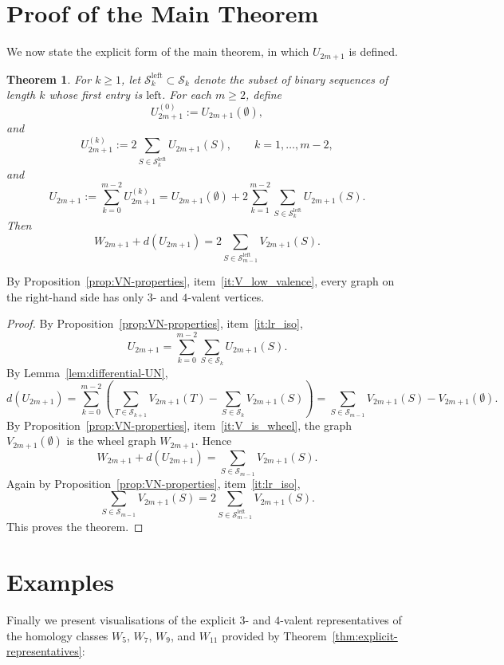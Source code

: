 \documentclass[11pt]{article}
\theoremstyle{definition}
\theoremstyle{plain}
\newtheorem{theorem}[definition]{Theorem}
\newcommand{\LeftChoice}{\mathrm{left}}
\begin{document}
\section{Proof of the Main Theorem}
We now state the explicit form of the main theorem, in which $U_{2m+1}$ is defined.

\begin{theorem}\label{thm:main-reduction}\label{thm:explicit-representatives}
For $k\geq 1$, let $\mathcal{S}_k^{\LeftChoice}\subset \mathcal{S}_k$ denote the subset of binary sequences of length $k$ whose first entry is $\LeftChoice$.
For each $m\geq 2$, define
\[
U_{2m+1}^{(0)}:=U_{2m+1}(\emptyset),
\]
and
\[
U_{2m+1}^{(k)}:=2\sum_{S\in \mathcal{S}_k^{\LeftChoice}} U_{2m+1}(S),
\qquad k=1,\dots,m-2,
\]
and
\[
U_{2m+1}:=\sum_{k=0}^{m-2} U_{2m+1}^{(k)}
=
U_{2m+1}(\emptyset)+2\sum_{k=1}^{m-2}\sum_{S\in \mathcal{S}_k^{\LeftChoice}} U_{2m+1}(S).
\]
Then
\[
W_{2m+1}+d(U_{2m+1})=2\sum_{S\in \mathcal{S}_{m-1}^{\LeftChoice}}V_{2m+1}(S).
\]
\end{theorem}

By Proposition~\ref{prop:VN-properties}, item~\ref{it:V_low_valence}, every graph on the right-hand side has only $3$- and $4$-valent vertices.

\begin{proof}
By Proposition~\ref{prop:VN-properties}, item~\ref{it:lr_iso},
\[
U_{2m+1}=\sum_{k=0}^{m-2}\sum_{S\in \mathcal{S}_k}U_{2m+1}(S).
\]
By Lemma~\ref{lem:differential-UN},
\[
d(U_{2m+1})
=
\sum_{k=0}^{m-2}
\left(
\sum_{T\in \mathcal{S}_{k+1}}V_{2m+1}(T)-\sum_{S\in \mathcal{S}_k}V_{2m+1}(S)
\right)
=
\sum_{S\in \mathcal{S}_{m-1}}V_{2m+1}(S)-V_{2m+1}(\emptyset).
\]
By Proposition~\ref{prop:VN-properties}, item~\ref{it:V_is_wheel}, the graph $V_{2m+1}(\emptyset)$ is the wheel graph $W_{2m+1}$. Hence
\[
W_{2m+1}+d(U_{2m+1})=\sum_{S\in \mathcal{S}_{m-1}}V_{2m+1}(S).
\]
Again by Proposition~\ref{prop:VN-properties}, item~\ref{it:lr_iso},
\[
\sum_{S\in \mathcal{S}_{m-1}}V_{2m+1}(S)
=
2\sum_{S\in \mathcal{S}_{m-1}^{\LeftChoice}}V_{2m+1}(S).
\]
This proves the theorem.
\end{proof}

\section{Examples}
Finally we present visualisations of the explicit $3$- and $4$-valent representatives of the homology classes $W_5$, $W_7$, $W_9$, and $W_{11}$ provided by Theorem~\ref{thm:explicit-representatives}:
\end{document}
